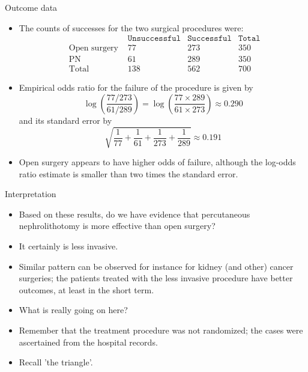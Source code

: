 \documentclass[10pt]{beamer}\usepackage[]{graphicx}\usepackage[]{color}
\begin{document}
\begin{frame}{Outcome data}
\begin{itemize}
	\item The counts of successes for the two surgical procedures were:
	$$
	\begin{array}{lccc}
	                       &\texttt{Unsuccessful}& \texttt{Successful}& \texttt{Total}\\
	\text { Open surgery } & 77 & 273 & 350 \\
	\text { PN } & 61 & 289 & 350 \\
	\text { Total } & 138 & 562 & 700
	\end{array}
	$$
	\item  Empirical odds ratio for the failure of the procedure is given by
	$$
	\log \left(\frac{77 / 273}{61 / 289}\right)=\log \left(\frac{77 \times 289}{61 \times 273}\right) \approx 0.290
	$$
	and its standard error by
	$$
	\sqrt{\frac{1}{77}+\frac{1}{61}+\frac{1}{273}+\frac{1}{289}} \approx 0.191
	$$
	\item Open surgery appears to have higher odds of failure, although the log-odds ratio estimate is smaller than two times the standard error.
\end{itemize}
\end{frame}


\begin{frame}{Interpretation}
\begin{itemize}
	\item Based on these results, do we have evidence that percutaneous nephrolithotomy is more effective than open surgery?
	\item It certainly is less invasive.
	\item Similar pattern can be observed for instance for kidney (and other) cancer surgeries; the patients treated with the less invasive procedure have better outcomes, at least in the short term.
	\item  What is really going on here?
	\item  Remember that the treatment procedure was not randomized; the cases were ascertained from the hospital records.
	\item  Recall 'the triangle'.
\end{itemize}
\end{frame}
\end{document}
